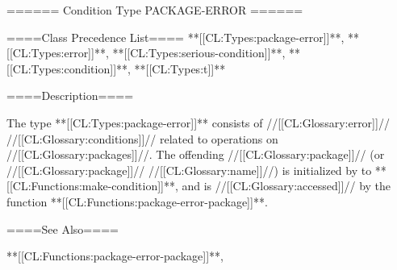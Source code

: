 ====== Condition Type PACKAGE-ERROR ======

====Class Precedence List==== **[[CL:Types:package-error]]**, **[[CL:Types:error]]**, **[[CL:Types:serious-condition]]**, **[[CL:Types:condition]]**, **[[CL:Types:t]]**

====Description====

The type **[[CL:Types:package-error]]** consists of //[[CL:Glossary:error]]// //[[CL:Glossary:conditions]]// related to operations on //[[CL:Glossary:packages]]//. The offending //[[CL:Glossary:package]]// (or //[[CL:Glossary:package]]// //[[CL:Glossary:name]]//) is initialized by  to **[[CL:Functions:make-condition]]**, and is //[[CL:Glossary:accessed]]// by the function **[[CL:Functions:package-error-package]]**.

====See Also====

**[[CL:Functions:package-error-package]]**, {\secref\Conditions}

